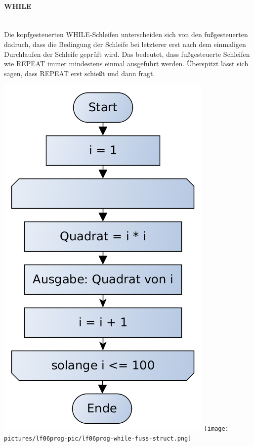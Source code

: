 \paragraph{WHILE}~\\

Die kopfgesteuerten WHILE-Schleifen unterscheiden sich von den fußgesteuerten dadruch, dass die Bedingung der Schleife bei letzterer erst nach dem einmaligen Durchlaufen der Schleife geprüft wird. Das bedeutet, dass fußgesteuerte Schleifen wie REPEAT immer mindestens einmal ausgeführt werden. Überspitzt lässt sich sagen, dass REPEAT erst schießt und dann fragt.

\includegraphics[scale=0.4]{pictures/lf06prog-pic/lf06prog-while-fuss-pap.png}
\texttt{[image: pictures/lf06prog-pic/lf06prog-while-fuss-struct.png]}

